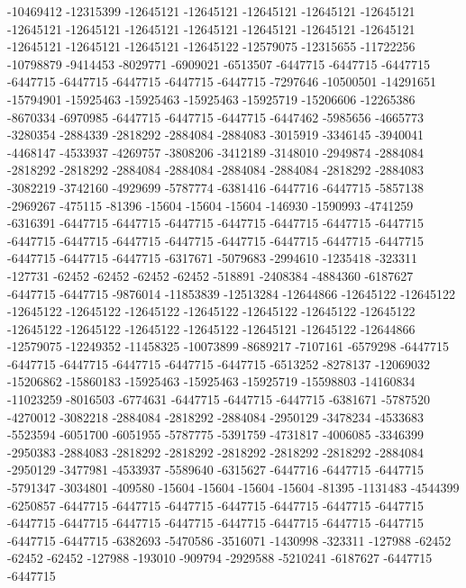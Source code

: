 -10469412 -12315399 -12645121 -12645121 -12645121 -12645121 -12645121 -12645121 -12645121 -12645121 -12645121 -12645121 -12645121 -12645121 -12645121 -12645121 -12645121 -12645122 -12579075 -12315655 -11722256 -10798879 -9414453 -8029771 -6909021 -6513507 -6447715 -6447715 -6447715 -6447715 -6447715 -6447715 -6447715 -6447715 -7297646 -10500501 -14291651 -15794901 -15925463 -15925463 -15925463 -15925719 -15206606 -12265386 -8670334 -6970985 -6447715 -6447715 -6447715 -6447462 -5985656 -4665773 -3280354 -2884339 -2818292 -2884084 -2884083 -3015919 -3346145 -3940041 -4468147 -4533937 -4269757 -3808206 -3412189 -3148010 -2949874 -2884084 -2818292 -2818292 -2884084 -2884084 -2884084 -2884084 -2818292 -2884083 -3082219 -3742160 -4929699 -5787774 -6381416 -6447716 -6447715 -5857138 -2969267 -475115 -81396 -15604 -15604 -15604 -146930 -1590993 -4741259 -6316391 -6447715 -6447715 -6447715 -6447715 -6447715 -6447715 -6447715 -6447715 -6447715 -6447715 -6447715 -6447715 -6447715 -6447715 -6447715 -6447715 -6447715 -6447715 -6317671 -5079683 -2994610 -1235418 -323311 -127731 -62452 -62452 -62452 -62452 -518891 -2408384 -4884360 -6187627 -6447715 -6447715
-9876014 -11853839 -12513284 -12644866 -12645122 -12645122 -12645122 -12645122 -12645122 -12645122 -12645122 -12645122 -12645122 -12645122 -12645122 -12645122 -12645122 -12645121 -12645122 -12644866 -12579075 -12249352 -11458325 -10073899 -8689217 -7107161 -6579298 -6447715 -6447715 -6447715 -6447715 -6447715 -6447715 -6513252 -8278137 -12069032 -15206862 -15860183 -15925463 -15925463 -15925719 -15598803 -14160834 -11023259 -8016503 -6774631 -6447715 -6447715 -6447715 -6381671 -5787520 -4270012 -3082218 -2884084 -2818292 -2884084 -2950129 -3478234 -4533683 -5523594 -6051700 -6051955 -5787775 -5391759 -4731817 -4006085 -3346399 -2950383 -2884083 -2818292 -2818292 -2818292 -2818292 -2818292 -2884084 -2950129 -3477981 -4533937 -5589640 -6315627 -6447716 -6447715 -6447715 -5791347 -3034801 -409580 -15604 -15604 -15604 -15604 -81395 -1131483 -4544399 -6250857 -6447715 -6447715 -6447715 -6447715 -6447715 -6447715 -6447715 -6447715 -6447715 -6447715 -6447715 -6447715 -6447715 -6447715 -6447715 -6447715 -6447715 -6382693 -5470586 -3516071 -1430998 -323311 -127988 -62452 -62452 -62452 -127988 -193010 -909794 -2929588 -5210241 -6187627 -6447715 -6447715
